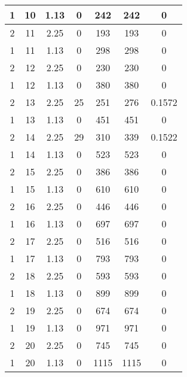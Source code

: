 \documentclass[letterpaper, 12pt]{article}
\begin{document}
\begin{longtable}{|c|c|c|c|c|c|c|}
\hline
1 & 10 & 1.13 & 0 & 242 & 242 & 0 \\
\hline
2 & 11 & 2.25 & 0 & 193 & 193 & 0 \\
\hline
1 & 11 & 1.13 & 0 & 298 & 298 & 0 \\
\hline
2 & 12 & 2.25 & 0 & 230 & 230 & 0 \\
\hline
1 & 12 & 1.13 & 0 & 380 & 380 & 0 \\
\hline
2 & 13 & 2.25 & 25 & 251 & 276 & 0.1572 \\
\hline
1 & 13 & 1.13 & 0 & 451 & 451 & 0 \\
\hline
2 & 14 & 2.25 & 29 & 310 & 339 & 0.1522 \\
\hline
1 & 14 & 1.13 & 0 & 523 & 523 & 0 \\
\hline
2 & 15 & 2.25 & 0 & 386 & 386 & 0 \\
\hline
1 & 15 & 1.13 & 0 & 610 & 610 & 0 \\
\hline
2 & 16 & 2.25 & 0 & 446 & 446 & 0 \\
\hline
1 & 16 & 1.13 & 0 & 697 & 697 & 0 \\
\hline
2 & 17 & 2.25 & 0 & 516 & 516 & 0 \\
\hline
1 & 17 & 1.13 & 0 & 793 & 793 & 0 \\
\hline
2 & 18 & 2.25 & 0 & 593 & 593 & 0 \\
\hline
1 & 18 & 1.13 & 0 & 899 & 899 & 0 \\
\hline
2 & 19 & 2.25 & 0 & 674 & 674 & 0 \\
\hline
1 & 19 & 1.13 & 0 & 971 & 971 & 0 \\
\hline
2 & 20 & 2.25 & 0 & 745 & 745 & 0 \\
\hline
1 & 20 & 1.13 & 0 & 1115 & 1115 & 0 \\
\hline
\end{longtable}
\end{document}
